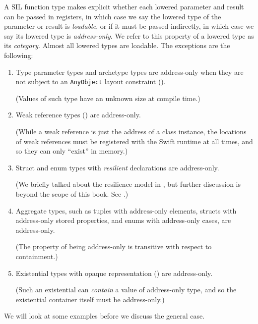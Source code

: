 \documentclass[../generics]{subfiles}
\begin{document}
A SIL function type makes explicit whether each lowered parameter and result can be passed in registers, in which case we say the lowered type of the parameter or result is \emph{loadable}, or if it must be passed indirectly, in which case we say its lowered type is \emph{address-only}. We refer to this property of a lowered type as its \emph{category}. Almost all lowered types are loadable. The exceptions are the following:
\begin{enumerate}
\item {}Type parameter types and archetype types are address-only when they are not subject to an \texttt{AnyObject} layout constraint ().

(Values of such type have an unknown size at compile time.)

\item {}Weak reference types  () are address-only.

(While a weak reference is just the address of a class instance, the locations of weak references must be registered with the Swift runtime at all times, and so they can only ``exist'' in memory.)

\item {}Struct and enum types with \emph{resilient} declarations are address-only.

(We briefly talked about the resilience model in , but further discussion is beyond the scope of this book. See \cite{evolutionblog,libraryevolution}.)

\item Aggregate types, such as tuples with address-only elements, structs with address-only stored properties, and enums with address-only cases, are address-only.

(The property of being address-only is transitive with respect to containment.)

\item {}Existential types with opaque representation () are address-only.

(Such an existential can \emph{contain} a value of address-only type, and so the existential container itself must be address-only.)
\end{enumerate}
We will look at some examples before we discuss the general case.
\end{document}
